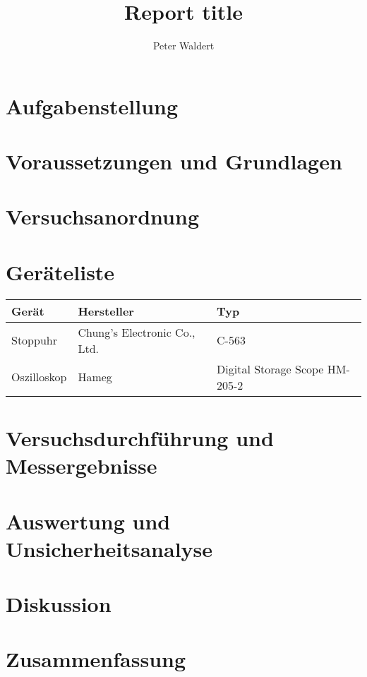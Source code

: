 \documentclass{report}
\title{Report title}
\author{Peter Waldert}
\date{}
\begin{document}
	\maketitle
	
	\tableofcontents
	\newpage
	
	\section{Aufgabenstellung}
	\section{Voraussetzungen und Grundlagen}
	\section{Versuchsanordnung}
	
	\section{Geräteliste}
	\begin{tabular}{|l|l|l|}
		\hline 
		\textbf{Gerät} & \textbf{Hersteller} & \textbf{Typ} \\ 
		\hline 
		Stoppuhr & Chung's Electronic Co., Ltd. & C-563 \\ \hline
		Oszilloskop & Hameg & Digital Storage Scope HM-205-2 \\ \hline
	\end{tabular}

	\section{Versuchsdurchführung und Messergebnisse}
	\section{Auswertung und Unsicherheitsanalyse}
	\section{Diskussion}
	\section{Zusammenfassung}
	
	\newpage
	\listoftables
	\listoffigures
\end{document}
